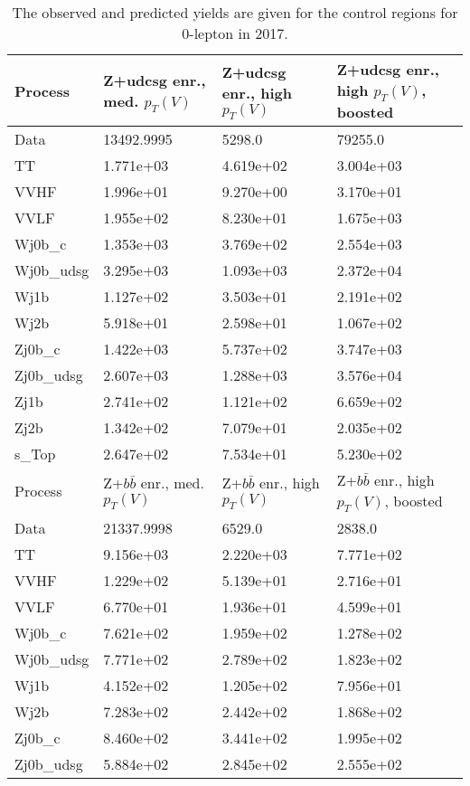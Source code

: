 \begin{table}
\centering
\caption[2017 0-lepton control region yields]{
                  The observed and predicted yields are given for the
                  control regions for 0-lepton in 2017.
                  }
{\footnotesize
\begin{tabularx}{0.8\textwidth}{|X|X|X|X|}
\hline
Process & Z+udcsg enr., med. $p_{T}(V)$ & Z+udcsg enr., high $p_{T}(V)$ & Z+udcsg enr., high $p_{T}(V)$, boosted \\
\hline
Data & 13492.9995 & 5298.0 & 79255.0 \\
\hline
TT & 1.771e+03 & 4.619e+02 & 3.004e+03 \\
VVHF & 1.996e+01 & 9.270e+00 & 3.170e+01 \\
VVLF & 1.955e+02 & 8.230e+01 & 1.675e+03 \\
Wj0b\_c & 1.353e+03 & 3.769e+02 & 2.554e+03 \\
Wj0b\_udsg & 3.295e+03 & 1.093e+03 & 2.372e+04 \\
Wj1b & 1.127e+02 & 3.503e+01 & 2.191e+02 \\
Wj2b & 5.918e+01 & 2.598e+01 & 1.067e+02 \\
Zj0b\_c & 1.422e+03 & 5.737e+02 & 3.747e+03 \\
Zj0b\_udsg & 2.607e+03 & 1.288e+03 & 3.576e+04 \\
Zj1b & 2.741e+02 & 1.121e+02 & 6.659e+02 \\
Zj2b & 1.342e+02 & 7.079e+01 & 2.035e+02 \\
s\_Top & 2.647e+02 & 7.534e+01 & 5.230e+02 \\
\hline
\hline
Process & Z+$b\bar{b}$ enr., med. $p_{T}(V)$ & Z+$b\bar{b}$ enr., high $p_{T}(V)$ & Z+$b\bar{b}$ enr., high $p_{T}(V)$, boosted \\
\hline
Data & 21337.9998 & 6529.0 & 2838.0 \\
\hline
TT & 9.156e+03 & 2.220e+03 & 7.771e+02 \\
VVHF & 1.229e+02 & 5.139e+01 & 2.716e+01 \\
VVLF & 6.770e+01 & 1.936e+01 & 4.599e+01 \\
Wj0b\_c & 7.621e+02 & 1.959e+02 & 1.278e+02 \\
Wj0b\_udsg & 7.771e+02 & 2.789e+02 & 1.823e+02 \\
Wj1b & 4.152e+02 & 1.205e+02 & 7.956e+01 \\
Wj2b & 7.283e+02 & 2.442e+02 & 1.868e+02 \\
Zj0b\_c & 8.460e+02 & 3.441e+02 & 1.995e+02 \\
Zj0b\_udsg & 5.884e+02 & 2.845e+02 & 2.555e+02 \\

\end{tabularx}}
\end{table}
